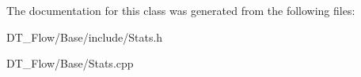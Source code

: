 The documentation for this class was generated from the following files\+:\begin{DoxyCompactItemize}
\item 
D\+T\+\_\+\+Flow/\+Base/include/Stats.\+h\item 
D\+T\+\_\+\+Flow/\+Base/Stats.\+cpp\end{DoxyCompactItemize}

